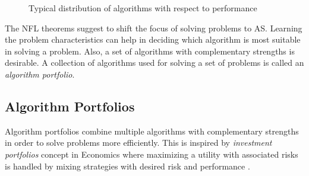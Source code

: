 \begin{figure}[H]
	\centering
	\caption{Typical distribution of algorithms with respect to performance}
	\label{fig:algoperfdist}
\end{figure}

The NFL theorems suggest to shift the focus of solving problems to AS. Learning the problem characteristics can help in deciding which algorithm is most suitable in solving a problem. Also, a set of algorithms with complementary strengths is desirable. A collection of algorithms used for solving a set of problems is called an \textit{algorithm portfolio}.

\subsection{Algorithm Portfolios}
Algorithm portfolios combine multiple algorithms with complementary strengths in order to solve problems more efficiently. This is inspired by \textit{investment portfolios} concept in Economics where maximizing a utility with associated risks is handled by mixing strategies with desired risk and performance \citep{huberman1997economics}.

